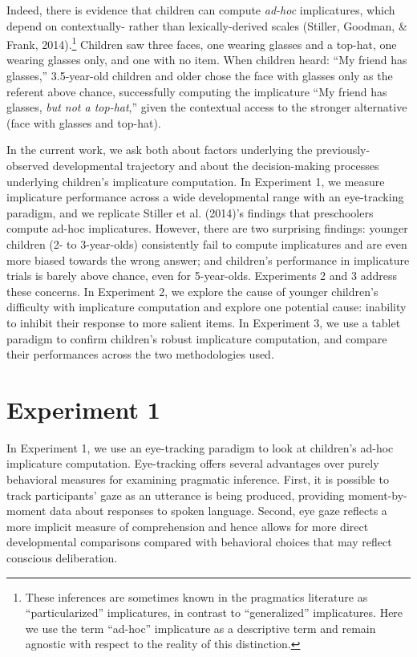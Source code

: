 \documentclass[a4paper,man,apacite,floatsintext]{apa6}
\begin{document}
Indeed, there is evidence that children can compute \emph{ad-hoc}
implicatures, which depend on contextually- rather than
lexically-derived scales (Stiller, Goodman, \& Frank, 2014).\footnote{These
  inferences are sometimes known in the pragmatics literature as
  ``particularized'' implicatures, in contrast to ``generalized''
  implicatures. Here we use the term ``ad-hoc'' implicature as a
  descriptive term and remain agnostic with respect to the reality of
  this distinction.} Children saw three faces, one wearing glasses and a
top-hat, one wearing glasses only, and one with no item. When children
heard: ``My friend has glasses,'' 3.5-year-old children and older chose
the face with glasses only as the referent above chance, successfully
computing the implicature ``My friend has glasses, \emph{but not a
top-hat},'' given the contextual access to the stronger alternative
(face with glasses and top-hat).

In the current work, we ask both about factors underlying the
previously-observed developmental trajectory and about the
decision-making processes underlying children's implicature computation.
In Experiment 1, we measure implicature performance across a wide
developmental range with an eye-tracking paradigm, and we replicate
Stiller et al. (2014)'s findings that preschoolers compute ad-hoc
implicatures. However, there are two surprising findings: younger
children (2- to 3-year-olds) consistently fail to compute implicatures
and are even more biased towards the wrong answer; and children's
performance in implicature trials is barely above chance, even for
5-year-olds. Experiments 2 and 3 address these concerns. In Experiment
2, we explore the cause of younger children's difficulty with
implicature computation and explore one potential cause: inability to
inhibit their response to more salient items. In Experiment 3, we use a
tablet paradigm to confirm children's robust implicature computation,
and compare their performances across the two methodologies used.

\section{Experiment 1}\label{experiment-1}

In Experiment 1, we use an eye-tracking paradigm to look at children's
ad-hoc implicature computation. Eye-tracking offers several advantages
over purely behavioral measures for examining pragmatic inference.
First, it is possible to track participants' gaze as an utterance is
being produced, providing moment-by-moment data about responses to
spoken language. Second, eye gaze reflects a more implicit measure of
comprehension and hence allows for more direct developmental comparisons
compared with behavioral choices that may reflect conscious
deliberation.
\end{document}
